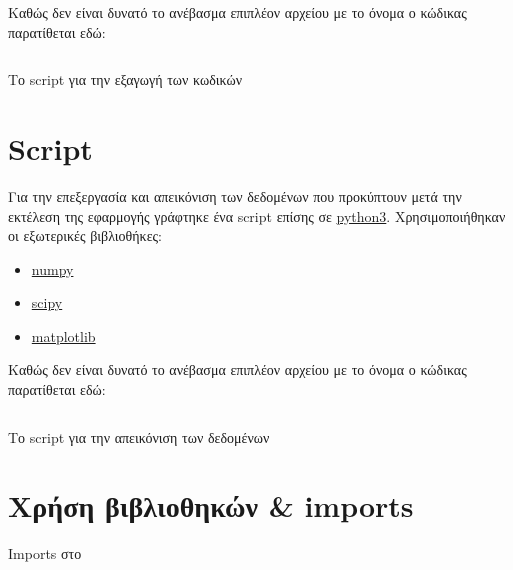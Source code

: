 Καθώς δεν είναι δυνατό το ανέβασμα επιπλέον αρχείου με το όνομα \scriptname{} ο κώδικας παρατίθεται εδώ:
\begin{code}
\inputminted[frame=single, breaklines=true, linenos=true, python3=true]{python}{../../extract-codes.py}
\caption{Το script για την εξαγωγή των κωδικών}
\end{code}

\section{Script \plotscriptname{}}\label{section:plot-script}
Για την επεξεργασία και απεικόνιση των δεδομένων που προκύπτουν μετά την εκτέλεση της εφαρμογής \appname{} γράφτηκε ένα script επίσης σε \href{https://www.python.org/}{python3}.
Χρησιμοποιήθηκαν οι εξωτερικές βιβλιοθήκες:
\begin{itemize}
\item \href{http://www.numpy.org/}{numpy}
\item \href{https://www.scipy.org/}{scipy}
\item \href{http://matplotlib.org/}{matplotlib}
\end{itemize}

Καθώς δεν είναι δυνατό το ανέβασμα επιπλέον αρχείου με το όνομα \plotscriptname{} ο κώδικας παρατίθεται εδώ:
\begin{code}
\inputminted[frame=single, breaklines=true, linenos=true, python3=true]{python}{../../graphs.py}
\caption{Το script για την απεικόνιση των δεδομένων}
\end{code}

\section{Χρήση βιβλιοθηκών \& imports}
\begin{code}
\caption{Imports στο \appname}
\end{code}

